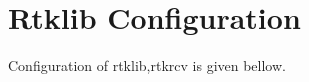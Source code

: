 \chapter{Rtklib Configuration}\label{APPENDIX:RTKLIB}


Configuration of \gls{rtklib},rtkrcv is given bellow.
